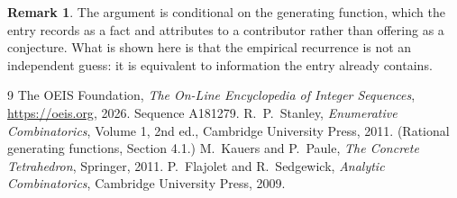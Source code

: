\documentclass[11pt,a4paper]{article}
\theoremstyle{plain}
\theoremstyle{definition}
\newtheorem{remark}[theorem]{Remark}
\begin{document}
\begin{remark}
The argument is conditional on the generating function, which the entry records as a fact and
attributes to a contributor rather than offering as a conjecture. What is shown here is that
the empirical recurrence is not an independent guess: it is equivalent to information the
entry already contains.
\end{remark}

\begin{thebibliography}{9}
 The OEIS Foundation, \emph{The On-Line Encyclopedia of Integer
Sequences}, \url{https://oeis.org}, 2026. Sequence A181279.
 R.~P.~Stanley, \emph{Enumerative Combinatorics}, Volume 1, 2nd ed.,
Cambridge University Press, 2011. (Rational generating functions, Section 4.1.)
 M.~Kauers and P.~Paule, \emph{The Concrete Tetrahedron}, Springer, 2011.
 P.~Flajolet and R.~Sedgewick, \emph{Analytic Combinatorics}, Cambridge
University Press, 2009.
\end{thebibliography}
\end{document}
